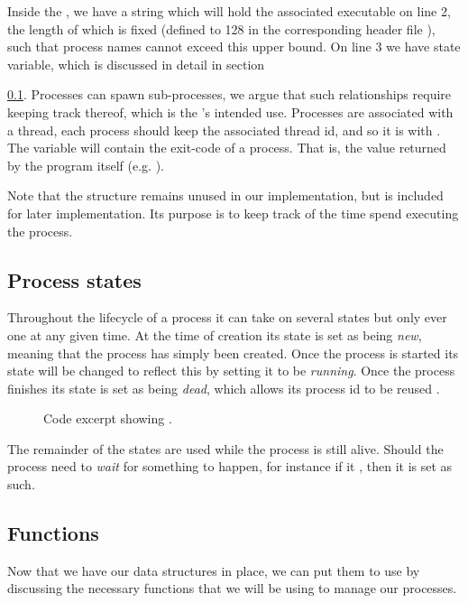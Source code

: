 Inside the , we have a string which will hold
the associated executable on line 2, the length of which is fixed (defined to
128 in the corresponding header file ), such that
process names cannot exceed this upper bound. On line 3 we have state
variable, which is discussed in detail in section 
{\ref{sec:types|sub:process-states}. Processes can spawn sub-processes, we
argue that such relationships require keeping track thereof, which is the
's intended use. Processes are associated with a thread, each
process should keep the associated thread id, and so it is with
. The  variable will contain the exit-code of a
process. That is, the value returned by the program itself (e.g. ).

Note that the  structure remains unused in our implementation, but
is included for later implementation. Its purpose is to keep track of the time
spend executing the process.

\subsection{Process states}
\label{sec:types|sub:process-states}
Throughout the lifecycle of a process it can take on several states but only
ever one at any given time. At the time of creation
 its state is set as being {\it new},
meaning that the process has simply been created. Once the process is started
 its state will be changed to reflect this by setting
it to be {\it running}. Once the process finishes its state is set as being {\it
dead}, which allows its process id to be reused
.
\begin{figure}[H]
    
    \label{code:process_state_t}
    \caption{Code excerpt showing .}
\end{figure}
The remainder of the states are used while the process is still alive. Should
the process need to {\it wait} for something to happen, for instance if it
 , then it is set as such.

\newpage
\subsection{Functions}
Now that we have our data structures in place, we can put them to use by
discussing the necessary functions that we will be using to manage our
processes.

}

